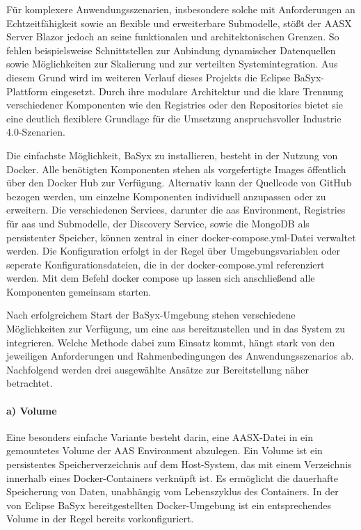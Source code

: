 Für komplexere Anwendungsszenarien, insbesondere solche mit Anforderungen an Echtzeitfähigkeit sowie an flexible und erweiterbare Submodelle, stößt der AASX Server Blazor jedoch an seine funktionalen und architektonischen Grenzen. 
So fehlen beispielsweise Schnittstellen zur Anbindung dynamischer Datenquellen sowie Möglichkeiten zur Skalierung und zur verteilten Systemintegration.
Aus diesem Grund wird im weiteren Verlauf dieses Projekts die Eclipse BaSyx-Plattform eingesetzt.
Durch ihre modulare Architektur und die klare Trennung verschiedener Komponenten wie den Registries oder den Repositories bietet sie eine deutlich flexiblere Grundlage für die Umsetzung anspruchsvoller Industrie 4.0-Szenarien.

Die einfachste Möglichkeit, BaSyx zu installieren, besteht in der Nutzung von Docker.
Alle benötigten Komponenten stehen als vorgefertigte Images öffentlich über den Docker Hub zur Verfügung. 
Alternativ kann der Quellcode von GitHub bezogen werden, um einzelne Komponenten individuell anzupassen oder zu erweitern.
Die verschiedenen Services, darunter die \acs{aas} Environment, Registries für \acs{aas} und Submodelle, der Discovery Service, sowie die MongoDB als persistenter Speicher, können zentral in einer docker-compose.yml-Datei verwaltet werden.
Die Konfiguration erfolgt in der Regel über Umgebungsvariablen oder seperate Konfigurationsdateien, die in der docker-compose.yml referenziert werden.
Mit dem Befehl docker compose up lassen sich anschließend alle Komponenten gemeinsam starten.

Nach erfolgreichem Start der BaSyx-Umgebung stehen verschiedene Möglichkeiten zur Verfügung, um eine \acs{aas} bereitzustellen und in das System zu integrieren. 
Welche Methode dabei zum Einsatz kommt, hängt stark von den jeweiligen Anforderungen und Rahmenbedingungen des Anwendungsszenarios ab.
Nachfolgend werden drei ausgewählte Ansätze zur Bereitstellung näher betrachtet.


\paragraph*{a) Volume}
Eine besonders einfache Variante besteht darin, eine AASX-Datei in ein gemountetes Volume der AAS Environment abzulegen.
Ein Volume ist ein persistentes Speicherverzeichnis auf dem Host-System, das mit einem Verzeichnis innerhalb eines Docker-Containers verknüpft ist.
Es ermöglicht die dauerhafte Speicherung von Daten, unabhängig vom Lebenszyklus des Containers.
In der von Eclipse BaSyx bereitgestellten Docker-Umgebung ist ein entsprechendes Volume in der Regel bereits vorkonfiguriert.

